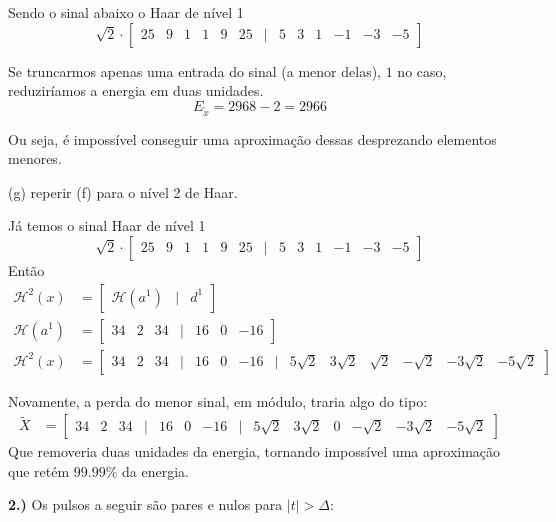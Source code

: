 \documentclass[10pt]{article}
\newcommand{\Ha}[1]{\mathcal{H}\left(#1\right)}
\newcommand{\Hn}[2]{\mathcal{H}^{#1}\left(#2\right)}
\begin{document}
Sendo o sinal abaixo o Haar de nível 1
\[\sqrt{2} \cdot \begin{bmatrix}
    25 & 9 & 1 & 1 & 9 & 25 & \mid & 5 & 3 & 1 & -1 & -3 & -5
\end{bmatrix}\]

Se truncarmos apenas uma entrada do sinal (a menor delas), $1$ no caso, reduziríamos a energia em duas unidades.
\[E_{\tilde{x}} = 2968 - 2 = 2966\]

Ou seja, é impossível conseguir uma aproximação dessas desprezando elementos menores.

(g) reperir (f) para o nível 2 de Haar.

Já temos o sinal Haar de nível 1
\[\sqrt{2} \cdot \begin{bmatrix}
    25 & 9 & 1 & 1 & 9 & 25 & \mid & 5 & 3 & 1 & -1 & -3 & -5
\end{bmatrix}\]
Então
\begin{align*}
\Hn{2}{x} &= \begin{bmatrix}
    \Ha{a^1} & | & d^1
\end{bmatrix}\\
\Ha{a^1} &= \begin{bmatrix}
    34 & 2 & 34 & \mid & 16 & 0 & -16
\end{bmatrix}\\
\Hn{2}{x} &= \begin{bmatrix}
    34 & 2 & 34 & \mid & 16 & 0 & -16 & | & 5\sqrt{2} & 3\sqrt{2} & \sqrt{2} & -\sqrt{2} & -3\sqrt{2} & -5\sqrt{2}
\end{bmatrix}
\end{align*}

Novamente, a perda do menor sinal, em módulo, traria algo do tipo:
\begin{align*}
    \tilde{X} &= \begin{bmatrix}
        34 & 2 & 34 & \mid & 16 & 0 & -16 & | & 5\sqrt{2} & 3\sqrt{2} & 0 & -\sqrt{2} & -3\sqrt{2} & -5\sqrt{2}
    \end{bmatrix}
\end{align*}
Que removeria duas unidades da energia, tornando impossível uma aproximação que retém $99.99\%$ da energia.


\vspace{\baselineskip}

\textbf{2.)} Os pulsos a seguir são pares e nulos para $|t| > \Delta:$
\end{document}
